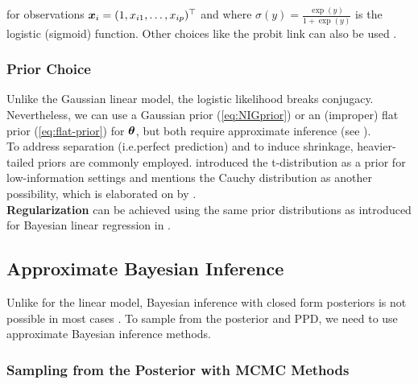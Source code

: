 for observations $\bm{x}_i = (1, x_{i1}, \dots, x_{ip})^\top$ and where $\sigma(y) = \frac{\exp(y)}{1 + \exp(y)}$ is the logistic (sigmoid) function.  Other choices like the probit link can also be used \citep[see e.g.][]{albert_bayesian_1993}.

\subsubsection*{Prior Choice}

Unlike the Gaussian linear model, the logistic likelihood breaks conjugacy.
Nevertheless, we can use a Gaussian prior (\autoref{eq:NIGprior}) or an (improper) flat prior (\autoref{eq:flat-prior}) for $\bm{\theta}$, but both require approximate inference (see ).\\

To address separation (i.e.\@ perfect prediction) and to induce shrinkage, heavier-tailed priors are commonly employed.
\citet{gelman_weakly_2008} introduced the t-distribution as a prior for low-information settings and mentions the Cauchy distribution as another possibility, which is elaborated on by \citet{ghosh_use_2017}.\\

\textbf{Regularization} can be achieved using the same prior distributions as introduced for Bayesian linear regression in  \citep[see e.g.][]{van_erp_shrinkage_2019,fahrmeir_bayesian_2010,ohara_review_2009}.

\subsection{Approximate Bayesian Inference} \label{sec:logit-inf}

Unlike for the linear model, Bayesian inference with closed form posteriors is not possible in most cases \citep[see e.g.][]{polson_bayesian_2013}.
To sample from the posterior and PPD, we need to use approximate Bayesian inference methods.

\subsubsection*{Sampling from the Posterior with MCMC Methods}

